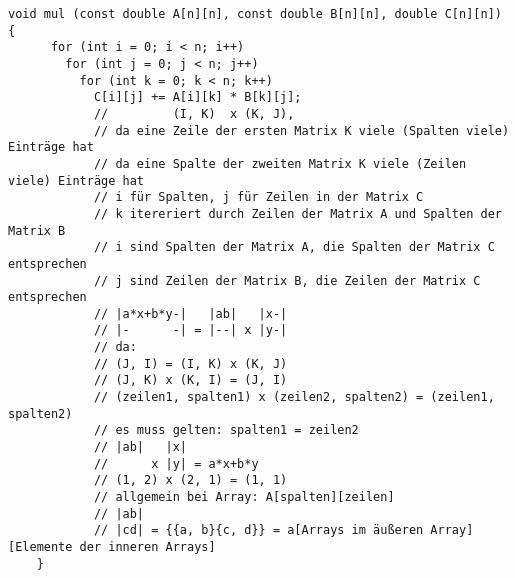 \documentclass[varwidth=17cm]{standalone}
\begin{document}
  \begin{BVerbatim}[gobble=4]
    void mul (const double A[n][n], const double B[n][n], double C[n][n]) {
      for (int i = 0; i < n; i++)
        for (int j = 0; j < n; j++)
          for (int k = 0; k < n; k++)
            C[i][j] += A[i][k] * B[k][j];
            //         (I, K)  x (K, J),
            // da eine Zeile der ersten Matrix K viele (Spalten viele) Einträge hat
            // da eine Spalte der zweiten Matrix K viele (Zeilen viele) Einträge hat
            // i für Spalten, j für Zeilen in der Matrix C
            // k itereriert durch Zeilen der Matrix A und Spalten der Matrix B
            // i sind Spalten der Matrix A, die Spalten der Matrix C entsprechen
            // j sind Zeilen der Matrix B, die Zeilen der Matrix C entsprechen
            // |a*x+b*y-|   |ab|   |x-|
            // |-      -| = |--| x |y-|
            // da:
            // (J, I) = (I, K) x (K, J)
            // (J, K) x (K, I) = (J, I)
            // (zeilen1, spalten1) x (zeilen2, spalten2) = (zeilen1, spalten2)
            // es muss gelten: spalten1 = zeilen2
            // |ab|   |x|
            //      x |y| = a*x+b*y
            // (1, 2) x (2, 1) = (1, 1)
            // allgemein bei Array: A[spalten][zeilen]
            // |ab|
            // |cd| = {{a, b}{c, d}} = a[Arrays im äußeren Array][Elemente der inneren Arrays]
    }
  \end{BVerbatim}
\end{document}
